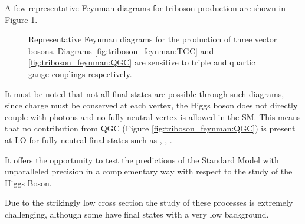 A few representative Feynman diagrams for triboson production are shown in Figure \ref{fig:triboson_feynman}.
\begin{figure}[th]
  \centering
  \caption{Representative Feynman diagrams for the production of three vector bosons. Diagrams \ref{fig:triboson_feynman:TGC} and \ref{fig:triboson_feynman:QGC} are sensitive to triple and quartic gauge couplings respectively.}
  \label{fig:triboson_feynman}
\end{figure}
It must be noted that not all final states are possible through such diagrams, since charge must be conserved at each vertex, the Higgs boson does not directly couple with photons and no fully neutral vertex is allowed in the SM.
This means that no contribution from QGC (Figure \ref{fig:triboson_feynman:QGC}) is present at LO for fully neutral final states such as \PZ\PZ\PZ, \PZ\PZ\PGg, \PZ\PGg\PGg.

It offers the opportunity to test the predictions of the Standard Model with unparalleled precision in a complementary way with respect to the study of the Higgs Boson.

Due to the strikingly low cross section the study of these processes is extremely challenging,
although some have final states with a very low background.

